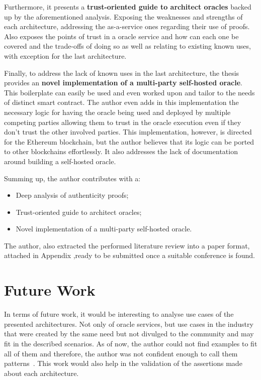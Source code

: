 Furthermore, it presents a \textbf{trust-oriented guide to architect oracles} backed up by the aforementioned analysis. Exposing the weaknesses and strengths of each architecture, addressing the as-a-service ones regarding their use of proofs. Also exposes the points of trust in a oracle service and how can each one be covered and the trade-offs of doing so as well as relating to existing known uses, with exception for the last architecture.

Finally, to address the lack of known uses in the last architecture, the thesis provides an \textbf{novel implementation of a multi-party self-hosted oracle}. This boilerplate can easily be used and even worked upon and tailor to the needs of distinct smart contract. The author even adds in this implementation the necessary logic for having the oracle being used and deployed by multiple competing parties allowing them to trust in the oracle execution even if they don't trust the other involved parties. This implementation, however, is directed for the Ethereum blockchain, but the author believes that its logic can be ported to other blockchains effortlessly. It also addresses the lack of documentation around building a self-hosted oracle.


\vspace{1cm}
Summing up, the author contributes with a:

\begin{itemize}
    \item Deep analysis of authenticity proofs;
    \item Trust-oriented guide to architect oracles;
    \item Novel implementation of a multi-party self-hosted oracle.
\end{itemize}

The author, also extracted the performed literature review into a paper format, attached in Appendix ,ready to be submitted once a suitable conference is found.

\section{Future Work}

In terms of future work, it would be interesting to analyse use cases of the presented architectures. Not only of oracle services, but use cases in the industry that were created by the same need but not divulged to the community and may fit in the described scenarios. As of now, the author could not find examples to fit all of them and therefore, the author was not confident enough to call them patterns~\citet{Alexander,Gamma1995}. This work would also help in the validation of the assertions made about each architecture.

